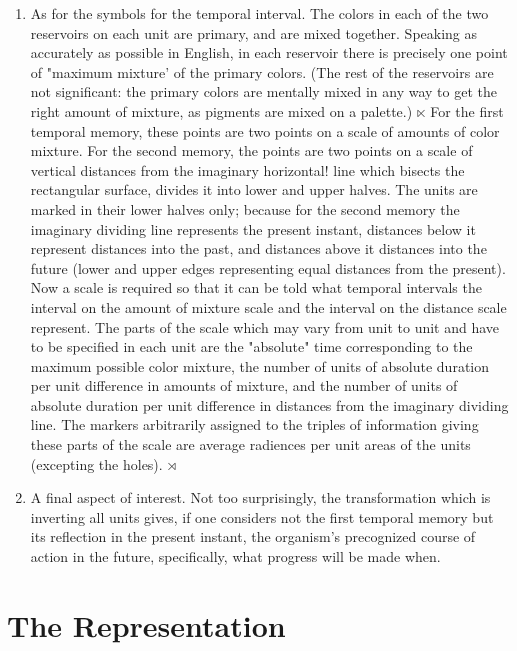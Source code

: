 \documentclass[10pt,twoside]{memoir}
\begin{document}
\begin{enumerate}
{\begin{enumerate}
\begin{sysrules}
\begin{sysrules}
\begin{sysrules}
\begin{sysrules}
{\begin{enumerate}
\begin{enumerate}
\item As for the symbols for the temporal interval. The colors in each of 
the two reservoirs on each unit are primary, and are mixed together. 
Speaking as accurately as possible in English, in each reservoir there is 
precisely one point of "maximum mixture' of the primary colors. (The rest 
of the reservoirs are not significant: the primary colors are mentally mixed in 
any way to get the right amount of mixture, as pigments are mixed on a 
palette.) $\ltimes$ For the first temporal memory, these points are two points on a 
scale of amounts of color mixture. For the second memory, the points are 
two points on a scale of vertical distances from the imaginary horizontal! line 
which bisects the rectangular surface, divides it into lower and upper halves. 
The units are marked in their lower halves only; because for the second 
memory the imaginary dividing line represents the present instant, distances 
below it represent distances into the past, and distances above it distances 
into the future (lower and upper edges representing equal distances from the 
present). Now a scale is required so that it can be told what temporal 
intervals the interval on the amount of mixture scale and the interval on the 
distance scale represent. The parts of the scale which may vary from unit to 
unit and have to be specified in each unit are the "absolute" time 
corresponding to the maximum possible color mixture, the number of units 
of absolute duration per unit difference in amounts of mixture, and the 
number of units of absolute duration per unit difference in distances from 
the imaginary dividing line. The markers arbitrarily assigned to the triples of 
information giving these parts of the scale are average radiences per unit 
areas of the units (excepting the holes). $\rtimes$

\item A final aspect of interest. Not too surprisingly, the transformation 
which is inverting all units gives, if one considers not the first temporal 
memory but its reflection in the present instant, the organism's precognized 
course of action in the future, specifically, what progress will be made when. 
\end{enumerate}


\section*{The Representation}


\end{enumerate}}
\end{sysrules}
\end{sysrules}
\end{sysrules}
\end{sysrules}
\end{enumerate}}
\end{enumerate}
\end{document}
